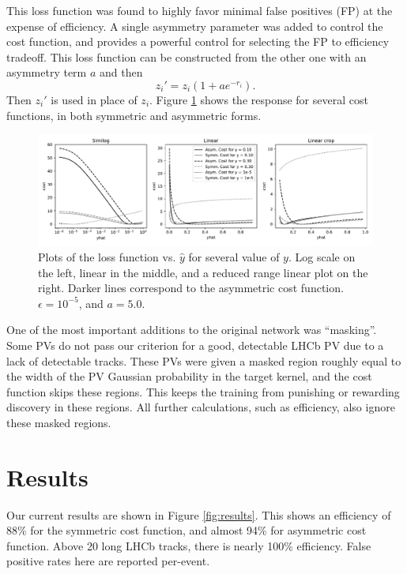 \documentclass[a4paper]{jpconf}
\begin{document}
This loss function was found to highly favor minimal false positives (FP) at the expense of efficiency. A single asymmetry parameter was added to control the cost function, and provides a powerful control for selecting the FP to efficiency tradeoff. This loss function can be constructed from the other one with an asymmetry term $a$ and then
\begin{equation}
z_i' = z_i \left(
1+a e^{-r_i}
\right).
\end{equation}
Then $z_i'$ is used in place of $z_i$.
Figure \ref{fig:loss} shows the response for several cost functions, in both symmetric and asymmetric forms.


\begin{figure}
	\centering
	\includegraphics[width=\textwidth]{images/LossPaper.pdf}
	\caption{Plots of the loss function vs. $\hat y$ for several value of $y$. Log scale on the left, linear in the middle, and a reduced range linear plot on the right. Darker lines correspond to the asymmetric cost function. $\epsilon=10^{-5}$, and $a=5.0$.}
	\label{fig:loss}
\end{figure}

One of the most important additions to the original network was ``masking''. Some PVs do not pass our criterion for a good, detectable LHCb PV due to a lack of detectable tracks. These PVs were given a masked region roughly equal to the width of the PV Gaussian probability in the target kernel, and the cost function skips these regions. This keeps the training from punishing or rewarding discovery in these regions. All further calculations, such as efficiency, also ignore these masked regions.

\section{Results}

Our current results are shown in Figure \ref{fig:results}. This shows an efficiency of 88\% for the symmetric cost function, and almost 94\% for asymmetric cost function. Above 20 long LHCb tracks, there is nearly 100\% efficiency. False positive rates here are reported per-event.
\end{document}
